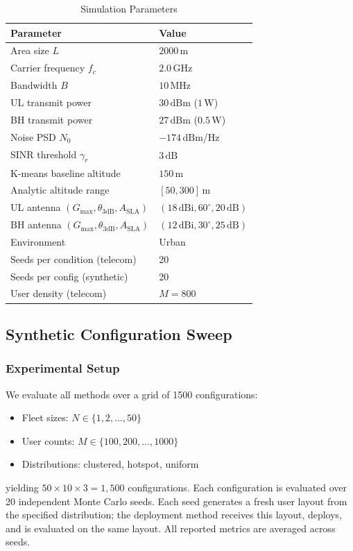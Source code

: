 \documentclass[conference]{IEEEtran}
\newcommand{\dB}{\,\mathrm{dB}}
\newcommand{\dBi}{\,\mathrm{dBi}}
\newcommand{\dBm}{\,\mathrm{dBm}}
\begin{document}
\begin{table}[t]
\centering
\caption{Simulation Parameters}
\label{tab:params}
\begin{tabular}{@{}ll@{}}
\toprule
Parameter & Value \\
\midrule
Area size $L$ & $2000$\,m \\
Carrier frequency $f_c$ & $2.0$\,GHz \\
Bandwidth $B$ & $10$\,MHz \\
UL transmit power & $30\dBm$ ($1$\,W) \\
BH transmit power & $27\dBm$ ($0.5$\,W) \\
Noise PSD $N_0$ & $-174\dBm$/Hz \\
SINR threshold $\gamma_r$ & $3\dB$ \\
K-means baseline altitude & $150$\,m \\
Analytic altitude range & $[50, 300]$\,m \\
UL antenna $(G_{\max}, \theta_{3\mathrm{dB}}, A_{\mathrm{SLA}})$ & $(18\dBi, 60^\circ, 20\dB)$ \\
BH antenna $(G_{\max}, \theta_{3\mathrm{dB}}, A_{\mathrm{SLA}})$ & $(12\dBi, 30^\circ, 25\dB)$ \\
Environment & Urban \\
Seeds per condition (telecom) & 20 \\
Seeds per config (synthetic) & 20 \\
User density (telecom) & $M = 800$ \\
\bottomrule
\end{tabular}
\end{table}

\subsection{Synthetic Configuration Sweep}
\label{sec:results_synthetic}

\subsubsection{Experimental Setup}

We evaluate all methods over a grid of 1500 configurations:
\begin{itemize}
    \item Fleet sizes: $N \in \{1, 2, \ldots, 50\}$
    \item User counts: $M \in \{100, 200, \ldots, 1000\}$
    \item Distributions: clustered, hotspot, uniform
\end{itemize}
yielding $50 \times 10 \times 3 = 1{,}500$ configurations.
Each configuration is evaluated over 20 independent Monte Carlo seeds. Each seed generates a fresh user layout from the specified distribution; the deployment method receives this layout, deploys, and is evaluated on the same layout. All reported metrics are averaged across seeds.
\end{document}
